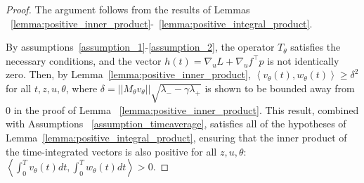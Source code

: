 \documentclass[letterpaper, 10 pt, conference]{ieeeconf}  %
\newcommand{\T}{^{\top}}
\newcommand{\inner}[2]{\left\langle #1, #2 \right\rangle}
\begin{document}
\begin{proof}
The argument follows from the results of Lemmas ~\ref{lemma:positive_inner_product}-~\ref{lemma:positive_integral_product}.

By assumptions~\ref{assumption_1}-\ref{assumption_2}, the operator $T_{\theta}$ satisfies the necessary conditions, and the vector $h(t) = \nabla_uL + \nabla_uf\T p$ is not identically zero. Then, by Lemma~\ref{lemma:positive_inner_product},
$\inner{v_\theta(t)}{w_\theta(t)} \geq \delta^2$ for all $t,z,u,\theta$, 
where $\delta = ||M_{\theta}v_{\theta}||\sqrt{\lambda_{-} - \gamma\lambda_{+}}$ is shown to be bounded away from 0 in the proof of Lemma ~\ref{lemma:positive_inner_product}.
This result, combined with Assumptions ~\ref{assumption_timeaverage}, satisfies all of the hypotheses of Lemma~\ref{lemma:positive_integral_product}, ensuring that the inner product of the time-integrated vectors is also positive for all $z,u,\theta$:\\
$
\inner{\int_{0}^{T}v_\theta(t)dt}{\int_{0}^{T}w_\theta(t)dt} > 0.$
\end{proof}
\end{document}
